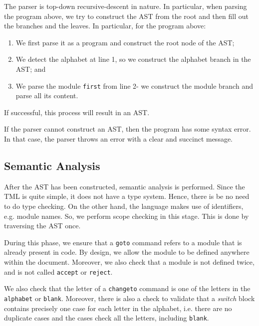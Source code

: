 The parser is top-down recursive-descent in nature. In particular, when parsing the program above, we try to construct the AST from the root and then fill out the branches and the leaves. In particular, for the program above:
\begin{enumerate}
    \item We first parse it as a program and construct the root node of the AST;
    \item We detect the alphabet at line 1, so we construct the alphabet branch in the AST; and 
    \item We parse the module \texttt{first} from line 2- we construct the module branch and parse all its content.
\end{enumerate}
If successful, this process will result in an AST.

If the parser cannot construct an AST, then the program has some syntax error. In that case, the parser throws an error with a clear and succinct message.


\subsection{Semantic Analysis}
After the AST has been constructed, semantic analysis is performed. Since the TML is quite simple, it does not have a type system. Hence, there is be no need to do type checking. On the other hand, the language makes use of identifiers, e.g. module names. So, we perform scope checking in this stage. This is done by traversing the AST once.



During this phase, we ensure that a \texttt{goto} command refers to a module that is already present in code. By design, we allow the module to be defined anywhere within the document. Moreover, we also check that a module is not defined twice, and is not called \texttt{accept} or \texttt{reject}.

We also check that the letter of a \texttt{changeto} command is one of the letters in the \texttt{alphabet} or \texttt{blank}. Moreover, there is also a check to validate that a \textit{switch} block contains precisely one case for each letter in the alphabet, i.e. there are no duplicate cases and the cases check all the letters, including \texttt{blank}.


